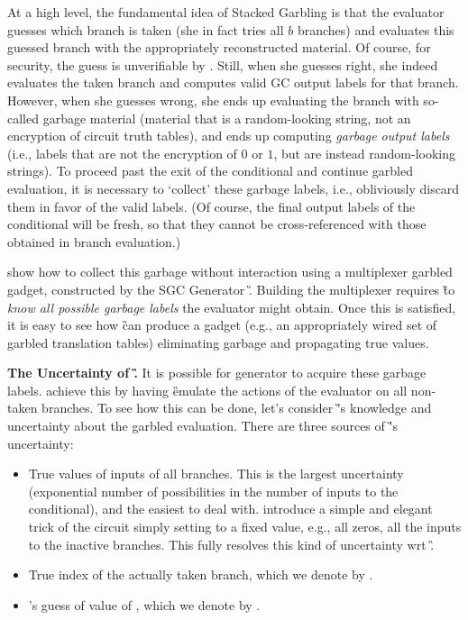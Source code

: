 At a high level, the fundamental idea of Stacked Garbling is that the evaluator \E
guesses which branch is taken (she in fact tries  all $b$
branches) and evaluates this guessed branch with the appropriately reconstructed material.  Of course, for security, the guess is unverifiable by \E. 
Still, when she guesses right, she indeed evaluates the taken branch and
computes valid GC output labels for that branch.
However, when she guesses wrong, she ends up evaluating the branch
with so-called garbage material (material that is a random-looking string, not
an encryption of circuit truth tables), and ends up computing
\emph{garbage output labels} (i.e., labels that are not the encryption
of $0$ or $1$, but are instead random-looking strings).
%
To proceed past the exit of the conditional and continue garbled evaluation, it is necessary to
`collect'  these garbage labels, i.e., obliviously  discard them in favor of the valid
labels.  (Of course, the final output labels of the conditional will be fresh,  so that they cannot be cross-referenced with those obtained in branch evaluation.)


\HK show how to collect this garbage without
interaction using a 
multiplexer garbled gadget, constructed by the SGC Generator \G.  
Building the \HK multiplexer requires \G to {\em know all possible
garbage labels} the evaluator might obtain.  Once this is satisfied, it is easy to see how \G can produce a gadget (e.g., an appropriately wired set of garbled translation tables) eliminating garbage and propagating true values.


{\bf The Uncertainty of \G.}
It is possible for generator to acquire these garbage labels.  \HK achieve this by having \G  emulate the actions of the
evaluator \E on all non-taken branches.  To see how this can be done, let's consider \G's knowledge and uncertainty about the garbled evaluation.  There are three sources of \G's uncertainty:
\begin{itemize}
	\item True values of inputs of all branches.  This is the largest uncertainty (exponential number of possibilities in the number of inputs to the conditional), and the easiest to deal with.  \HK introduce a simple and elegant trick of the circuit simply setting to a fixed value, e.g., all zeros, all the inputs to the inactive branches.  This fully resolves this kind of uncertainty wrt \G.
	\item True index of the actually taken branch, which we denote by \truth.
	\item \E's guess of value of \truth, which we denote by \guess.
\end{itemize}

